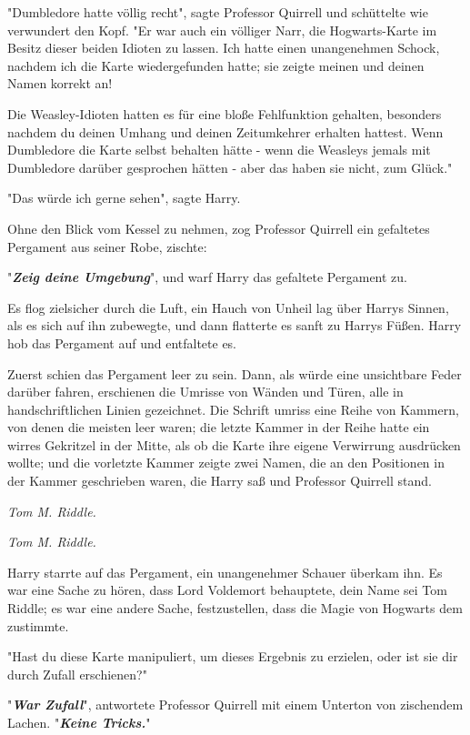 {"Dumbledore hatte völlig recht", sagte Professor Quirrell und schüttelte wie verwundert den Kopf. "Er war auch ein völliger Narr, die Hogwarts-Karte im Besitz dieser beiden Idioten zu lassen. Ich hatte einen unangenehmen Schock, nachdem ich die Karte wiedergefunden hatte; sie zeigte meinen und deinen Namen korrekt an!

Die Weasley-Idioten hatten es für eine bloße Fehlfunktion gehalten, besonders nachdem du deinen Umhang und deinen Zeitumkehrer erhalten hattest. Wenn Dumbledore die Karte selbst behalten hätte - wenn die Weasleys jemals mit Dumbledore darüber gesprochen hätten - aber das haben sie nicht, zum Glück."

"Das würde ich gerne sehen", sagte Harry.

Ohne den Blick vom Kessel zu nehmen, zog Professor Quirrell ein gefaltetes Pergament aus seiner Robe, zischte:

"\textbf{\emph{Zeig deine Umgebung}}", und warf Harry das gefaltete Pergament zu.

Es flog zielsicher durch die Luft, ein Hauch von Unheil lag über Harrys Sinnen, als es sich auf ihn zubewegte, und dann flatterte es sanft zu Harrys Füßen. Harry hob das Pergament auf und entfaltete es.

Zuerst schien das Pergament leer zu sein. Dann, als würde eine unsichtbare Feder darüber fahren, erschienen die Umrisse von Wänden und Türen, alle in handschriftlichen Linien gezeichnet. Die Schrift umriss eine Reihe von Kammern, von denen die meisten leer waren; die letzte Kammer in der Reihe hatte ein wirres Gekritzel in der Mitte, als ob die Karte ihre eigene Verwirrung ausdrücken wollte; und die vorletzte Kammer zeigte zwei Namen, die an den Positionen in der Kammer geschrieben waren, die Harry saß und Professor Quirrell stand.

\emph{\hfill\break Tom M. Riddle.}

\emph{Tom M. Riddle.}

Harry starrte auf das Pergament, ein unangenehmer Schauer überkam ihn. Es war eine Sache zu hören, dass Lord Voldemort behauptete, dein Name sei Tom Riddle; es war eine andere Sache, festzustellen, dass die Magie von Hogwarts dem zustimmte.

"Hast du diese Karte manipuliert, um dieses Ergebnis zu erzielen, oder ist sie dir durch Zufall erschienen?"

"\textbf{\emph{War Zufall}}", antwortete Professor Quirrell mit einem Unterton von zischendem Lachen. "\textbf{\emph{Keine Tricks.}}"

}

